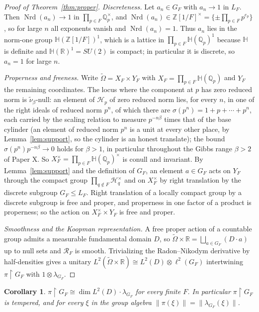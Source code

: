 \documentclass[11pt]{amsart}
\numberwithin{equation}{section}
\newtheorem{corollary}[theorem]{Corollary}
\theoremstyle{definition}
\theoremstyle{remark}
\newcommand{\Z}{\mathbb{Z}}
\newcommand{\Q}{\mathbb{Q}}
\newcommand{\R}{\mathbb{R}}
\newcommand{\HH}{\mathbb{H}}
\newcommand{\cH}{\mathcal{H}}
\newcommand{\cR}{\mathcal{R}}
\newcommand{\Nrd}{\operatorname{Nrd}}
\begin{document}
\begin{proof}[Proof of Theorem~\ref{thm:proper}]
\emph{Discreteness.} Let $a_n\in G_F$ with $a_n\to1$ in $L_F$. Then $\Nrd(a_n)\to1$ in
$\prod_{p\in F}\Q_p^\times$, and $\Nrd(a_n)\in\Z[1/F]^\times=\{\pm\prod_{p\in F}p^{e_p}\}$, so for
large $n$ all exponents vanish and $\Nrd(a_n)=1$. Thus $a_n$ lies in the norm-one group
$\HH(\Z[1/F])^1$, which is a lattice in $\prod_{p\in F}\HH(\Q_p)^1$ because $\HH$ is definite and
$\HH(\R)^1=SU(2)$ is compact; in particular it is discrete, so $a_n=1$ for large $n$.

\emph{Properness and freeness.} Write $\widetilde\Omega=X_F\times Y_F$ with
$X_F=\prod_{p\in F}\HH(\Q_p)$ and $Y_F$ the remaining coordinates. The locus where the component at $p$
has zero reduced norm is $\widetilde\nu_\beta$-null: an element of $\cH_p$ of zero reduced
norm lies, for every $n$, in one of the right ideals of reduced norm $p^n$, of which there
are $\sigma(p^n)=1+p+\cdots+p^n$, each carried by the scaling relation to measure
$p^{-n\beta}$ times that of the base cylinder (an element of reduced norm $p^n$ is a unit at
every other place, by Lemma~\ref{lem:support}, so the cylinder is an honest translate); the
bound $\sigma(p^n)p^{-n\beta}\to0$ holds for $\beta>1$, in particular throughout the Gibbs
range $\beta>2$ of Paper X. So $X_F^\times=\prod_{p\in F}\HH(\Q_p)^\times$ is conull and invariant.
By Lemma~\ref{lem:support} and the definition of $G_F$, an element $a\in G_F$ acts on $Y_F$ through
the compact group $\prod_{q\notin F}\cH_q^\times$ and on $X_F^\times$ by right translation by the
discrete subgroup $G_F\le L_F$. Right translation of a locally compact group by a discrete subgroup
is free and proper, and properness in one factor of a product is properness; so the action on
$X_F^\times\times Y_F$ is free and proper.

\emph{Smoothness and the Koopman representation.} A free proper action of a countable group admits
a measurable fundamental domain $D$, so $\widetilde\Omega\times\R=\bigsqcup_{a\in G_F}(D\cdot a)$
up to null sets and $\cR_F$ is smooth. Trivializing the Radon--Nikodym derivative by half-densities
gives a unitary
$L^2(\widetilde\Omega\times\R)\cong L^2(D)\otimes\ell^2(G_F)$ intertwining $\pi\restriction G_F$
with $1\otimes\lambda_{G_F}$.
\end{proof}

\begin{corollary}\label{cor:regular}
$\pi\restriction G_F\cong\dim L^2(D)\cdot\lambda_{G_F}$ for every finite $F$. In particular
$\pi\restriction G_F$ is tempered, and for every $\xi$ in the group algebra
$\|\pi(\xi)\|=\|\lambda_{G_F}(\xi)\|$.
\end{corollary}
\end{document}
